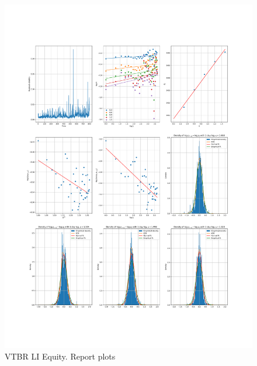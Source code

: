    \begin{figure}[h]
        \centering
        \includegraphics[width=\textwidth]{fig/VTBR LI Equity.pdf}
        \caption{VTBR LI Equity. Report plots}
    \end{figure} 
        
